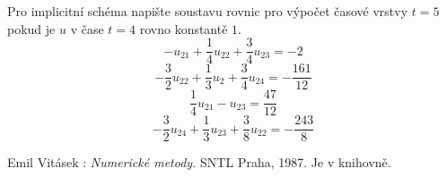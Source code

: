 \documentclass[a4paper,10pt]{article}
\begin{document}
Pro implicitní schéma napište soustavu rovnic pro výpočet časové vrstvy $t=5$ pokud je $u$ v čase $t=4$ rovno konstantě $1$. 
\[
  -u_{21}+\frac14u_{22}+\frac34u_{23}=-2
\]
\[
  -\frac32u_{22}+\frac13u_{2}+\frac34u_{24}=-\frac{161}{12}
\]
\[
 \frac14u_{21}-u_{23}=\frac{47}{12}
\]
\[
 -\frac32u_{24}+\frac13u_{23}+\frac38u_{22}=-\frac{243}{8}
\]

\begin{thebibliography}{9}
	Emil Vitásek : {\it Numerické metody.}
	SNTL Praha, 1987. Je v knihovně.
\end{thebibliography}
\end{document}
